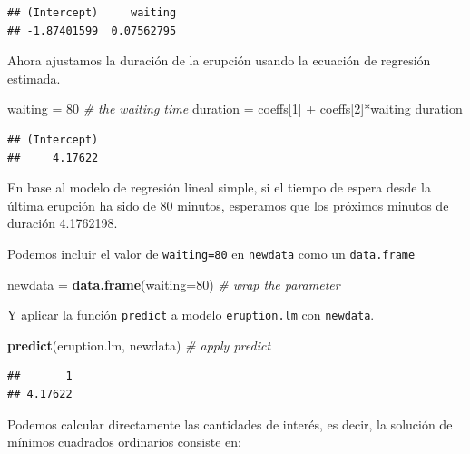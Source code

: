 \documentclass[]{article}
\newenvironment{Shaded}{\begin{snugshade}}{\end{snugshade}}
\newcommand{\KeywordTok}[1]{\textcolor[rgb]{0.13,0.29,0.53}{\textbf{{#1}}}}
\newcommand{\DataTypeTok}[1]{\textcolor[rgb]{0.13,0.29,0.53}{{#1}}}
\newcommand{\DecValTok}[1]{\textcolor[rgb]{0.00,0.00,0.81}{{#1}}}
\newcommand{\StringTok}[1]{\textcolor[rgb]{0.31,0.60,0.02}{{#1}}}
\newcommand{\CommentTok}[1]{\textcolor[rgb]{0.56,0.35,0.01}{\textit{{#1}}}}
\newcommand{\NormalTok}[1]{{#1}}
\numberwithin{equation}{section}
\begin{document}
\begin{verbatim}
## (Intercept)     waiting 
## -1.87401599  0.07562795
\end{verbatim}

Ahora ajustamos la duración de la erupción usando la ecuación de
regresión estimada.

\begin{Shaded}
\begin{Highlighting}[]
\NormalTok{waiting =}\StringTok{ }\DecValTok{80}           \CommentTok{# the waiting time }
\NormalTok{duration =}\StringTok{ }\NormalTok{coeffs[}\DecValTok{1}\NormalTok{] +}\StringTok{ }\NormalTok{coeffs[}\DecValTok{2}\NormalTok{]*waiting }
\NormalTok{duration }
\end{Highlighting}
\end{Shaded}

\begin{verbatim}
## (Intercept) 
##     4.17622
\end{verbatim}

En base al modelo de regresión lineal simple, si el tiempo de espera
desde la última erupción ha sido de 80 minutos, esperamos que los
próximos minutos de duración 4.1762198.

Podemos incluir el valor de \texttt{waiting=80} en \texttt{newdata} como
un \texttt{data.frame}

\begin{Shaded}
\begin{Highlighting}[]
\NormalTok{newdata =}\StringTok{ }\KeywordTok{data.frame}\NormalTok{(}\DataTypeTok{waiting=}\DecValTok{80}\NormalTok{) }\CommentTok{# wrap the parameter }
\end{Highlighting}
\end{Shaded}

Y aplicar la función \texttt{predict} a modelo \texttt{eruption.lm} con
\texttt{newdata}.

\begin{Shaded}
\begin{Highlighting}[]
\KeywordTok{predict}\NormalTok{(eruption.lm, newdata)    }\CommentTok{# apply predict }
\end{Highlighting}
\end{Shaded}

\begin{verbatim}
##       1 
## 4.17622
\end{verbatim}

Podemos calcular directamente las cantidades de interés, es decir, la
solución de mínimos cuadrados ordinarios consiste en:
\end{document}
